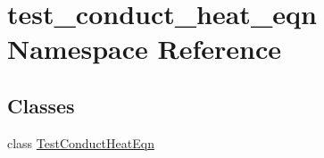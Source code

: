 \hypertarget{namespacetest__conduct__heat__eqn}{}\section{test\+\_\+conduct\+\_\+heat\+\_\+eqn Namespace Reference}
\label{namespacetest__conduct__heat__eqn}
\subsection*{Classes}
\begin{DoxyCompactItemize}
\item 
class \hyperlink{classtest__conduct__heat__eqn_1_1TestConductHeatEqn}{Test\+Conduct\+Heat\+Eqn}
\end{DoxyCompactItemize}
